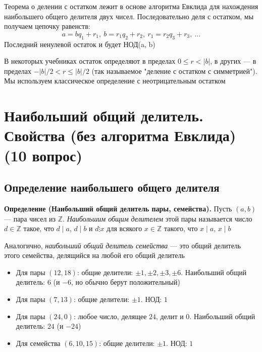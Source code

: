 \documentclass[a4paper,12pt]{article}
\theoremstyle{definition}
\theoremstyle{plain}
\theoremstyle{remark}
\begin{document}
	\begin{tcolorbox}[colback=purple!5, colframe=purple!50!black, title=Заметочка: Алгоритм Евклида]
		Теорема о делении с остатком лежит в основе алгоритма Евклида для нахождения наибольшего общего делителя двух чисел. Последовательно деля с остатком, мы получаем цепочку равенств:
		\[
		a = bq_1 + r_1,\ b = r_1q_2 + r_2,\ r_1 = r_2q_3 + r_3,\ \dots
		\]
		Последний ненулевой остаток и будет НОД(a, b)
	\end{tcolorbox}
	
	\begin{tcolorbox}[colback=yellow!5, colframe=orange!60!black, title=Важное замечание]
		В некоторых учебниках остаток определяют в пределах $0 \leq r < |b|$, в других — в пределах $-|b|/2 < r \leq |b|/2$ (так называемое "деление с остатком с симметрией"). Мы используем классическое определение с неотрицательным остатком
	\end{tcolorbox}
	
	
	
	
	
	
	
	\newpage
	\section{Наибольший общий делитель. Свойства (без алгоритма Евклида) (10 вопрос)}
	
	\subsection{Определение наибольшего общего делителя}
	
	\noindent \textbf{Определение (Наибольший общий делитель пары, семейства).}
	Пусть $(a, b)$ — пара чисел из $\mathbb{Z}$. \textit{Наибольшим общим делителем} этой пары называется число $d \in \mathbb{Z}$ такое, что $d \mid a$, $d \mid b$ и $d \vdots x$ для всякого $x \in \mathbb{Z}$ такого, что $x \mid a$, $x \mid b$
	
	Аналогично, \textit{наибольший общий делитель семейства} — это общий делитель этого семейства, делящийся на любой его общий делитель
	
	\begin{tcolorbox}[colback=blue!5, colframe=blue!40!black, title=Примеры]
		\begin{itemize}
			\item Для пары $(12, 18)$: общие делители: $\pm 1, \pm 2, \pm 3, \pm 6$. Наибольший общий делитель: $6$ (и $-6$, но обычно берут положительный)
			\item Для пары $(7, 13)$: общие делители: $\pm 1$. НОД: $1$
			\item Для пары $(24, 0)$: любое число, делящее $24$, делит и $0$. Наибольший общий делитель: $24$ (и $-24$)
			\item Для семейства $(6, 10, 15)$: общие делители: $\pm 1$. НОД: $1$
		\end{itemize}
	\end{tcolorbox}
	
\end{document}
